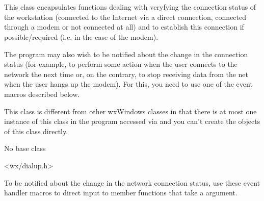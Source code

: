 
\section{}\label{wxdialupmanager}

This class encapsulates functions dealing with veryfying the connection status
of the workstation (connected to the Internet via a direct connection,
connected through a modem or not connected at all) and to establish this
connection if possible/required (i.e. in the case of the modem).

The program may also wish to be notified about the change in the connection
status (for example, to perform some action when the user connects to the
network the next time or, on the contrary, to stop receiving data from the net
when the user hangs up the modem). For this, you need to use one of the event
macros described below.

This class is different from other wxWindows classes in that there is at most
one instance of this class in the program accessed via 
 and you can't
create the objects of this class directly.


No base class


<wx/dialup.h>


To be notified about the change in the network connection status, use these
event handler macros to direct input to member functions that take a 
 argument.

\twocolwidtha{7cm}
\begin{twocollist}\itemsep=0pt
\end{twocollist}%

